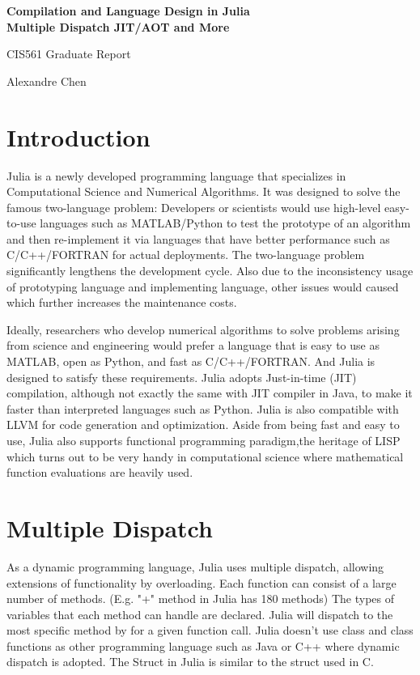 \documentclass[11pt]{article}
\begin{document}
\begin{center}

  \textbf{\Large Compilation and Language Design in Julia}\\\vspace{3pt}
  \textbf{Multiple Dispatch JIT/AOT and More}

  {\large CIS561 Graduate Report}\\\vspace{3pt}

Alexandre Chen

\end{center}





\section{Introduction}\label{sec:Introduction}
Julia is a newly developed programming language that specializes in Computational Science and Numerical Algorithms. It was designed to solve the famous two-language problem: Developers or scientists would use high-level easy-to-use languages such as MATLAB/Python to test the prototype of an algorithm and then re-implement it via languages that have better performance such as C/C++/FORTRAN for actual deployments. The two-language problem significantly lengthens the development cycle. Also due to the inconsistency usage of prototyping language and implementing language, other issues would caused which further increases the maintenance costs. 

Ideally, researchers who develop numerical algorithms to solve problems arising from science and engineering would prefer a language that is easy to use as MATLAB, open as Python, and fast as C/C++/FORTRAN. And Julia is designed to satisfy these requirements. Julia adopts Just-in-time (JIT) compilation, although not exactly the same with JIT compiler in Java, to make it faster than interpreted languages such as Python. Julia is also compatible with LLVM for code generation and optimization. Aside from being fast and easy to use, Julia also supports functional programming paradigm,the heritage of LISP which turns out to be very handy in computational science where mathematical function evaluations are heavily used. 

\section{Multiple Dispatch}
As a dynamic programming language, Julia uses multiple dispatch, allowing extensions of functionality by overloading. Each function can consist of a large number of methods. (E.g. "+" method in Julia has 180 methods) The types of variables that each method can handle are declared. Julia will dispatch to the most specific method by for a given function call. Julia doesn't use class and class functions as other programming language such as Java or C++ where dynamic dispatch is adopted. The Struct in Julia is similar to the struct used in C.
\end{document}
